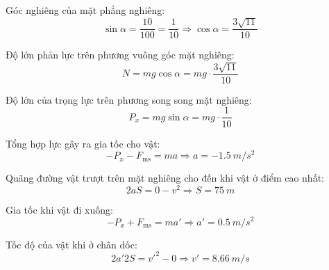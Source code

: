 \begin{enumerate}[label=\bfseries Câu \arabic*:]
	\loigiai
	{Góc nghiêng của mặt phẳng nghiêng:
		$$\sin \alpha = \dfrac{10}{100} = \dfrac{1}{10} \Rightarrow \cos \alpha = \dfrac{3\sqrt{11}}{10}$$
		
		Độ lớn phản lực trên phương vuông góc mặt nghiêng:
		$$N=mg \cos \alpha = mg \cdot \dfrac{3\sqrt{11}}{10}$$
		
		Độ lớn của trọng lực trên phương song song mặt nghiêng:
		$$P_x = mg \sin \alpha = mg \cdot \dfrac{1}{10}$$
		
		Tổng hợp lực gây ra gia tốc cho vật:
		$$-P_x - F_\text{ms} = ma \Rightarrow a =\SI{-1.5}{m/s^2} $$
		
		Quãng đường vật trượt trên mặt nghiêng cho đến khi vật ở điểm cao nhất:
		$$2aS = 0 -v^2 \Rightarrow S = \SI{75}{m}$$
		
		Gia tốc khi vật đi xuống:
		$$-P_x + F_\text{ms} = ma' \Rightarrow a' = \SI{0.5}{m/s^2}$$
		
		Tốc độ của vật khi ở chân dốc:
		$$2a' 2S = v'^2 - 0 \Rightarrow v' = \SI{8.66}{m/s}$$
	}
\end{enumerate}